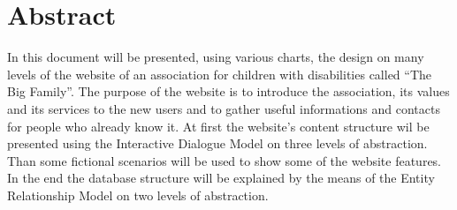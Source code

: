 %
%
%
\chapter{Abstract}
%
%
%
In this document will be presented, using various charts, the design on many levels of the website of an association for children with disabilities called ``The Big Family''. The purpose of the website is to introduce the association, its values and its services to the new users and to gather useful informations and contacts for people who already know it.
\linebreak
At first the website's content structure wil be presented using the Interactive Dialogue Model on three levels of abstraction. Than some fictional scenarios will be used to show some of the website features. In the end the database structure will be explained by the means of the Entity Relationship Model on two levels of abstraction.
%
